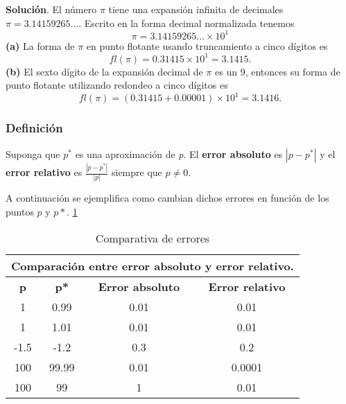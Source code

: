\textbf{Solución}. El número $\pi$ tiene una expansión infinita de decimales $\pi=3.14159265...$.
Escrito en la forma decimal normalizada tenemos
\begin{equation*}
    \pi=3.14159265...\times10^{1}
\end{equation*}
\quad\quad\quad \textbf{(a)} La forma de $\pi$ en punto flotante usando truncamiento a cinco dígitos es 
\begin{equation*}
    fl(\pi)=0.31415\times10^{1}=3.1415.
\end{equation*}
\quad\quad\quad \textbf{(b)} El sexto dígito de la expansión decimal de  $\pi$ es un 9, entonces su forma de punto flotante utilizando redondeo a cinco dígitos es
\begin{equation*}
    fl(\pi)=(0.31415+0.00001)\times10^{1}=3.1416.
\end{equation*}

\begin{tcolorbox}[colback=gray!5!]
\subsubsection*{Definición}
Suponga que \textit{$p^{*}$} es una aproximación de \textit{p}. El \textbf{error absoluto} es $|p-p^{*}|$  y el \textbf{error relativo} es $\frac{|p-p^{*}|}{|p|}$ siempre que $p\neq0$.
\end{tcolorbox}

A continuación se ejemplifica como cambian dichos errores en función de los puntos $p$ y $p*$. \ref{tab:tabla1}



\begin{table}[h!]
\centering
    \begin{tabular}{c c c c}
    \multicolumn{4}{c}{\textbf{Comparación entre error absoluto y error relativo.}}\tabularnewline
    \hline 
    \textbf{p} & \textbf{p*} & \textbf{Error absoluto} & \textbf{Error relativo} \\
    \hline 
    1 & 0.99 & 0.01 & 0.01 \\
    1 & 1.01 & 0.01 & 0.01 \\
    -1.5 & -1.2 & 0.3 & 0.2 \\
    100 & 99.99 & 0.01 & 0.0001 \\
    100 & 99 & 1 & 0.01 \\
    \hline 
    \end{tabular}
    \caption{Comparativa de errores}
    \label{tab:tabla1}
\end{table}

